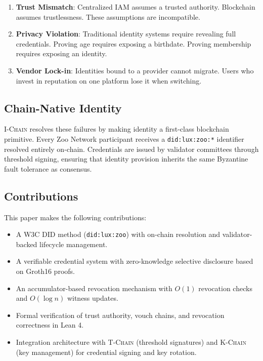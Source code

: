\documentclass[11pt,letterpaper]{article}
\theoremstyle{definition}
\theoremstyle{remark}
\newcommand{\IChain}{\textsc{I-Chain}}
\newcommand{\TChain}{\textsc{T-Chain}}
\newcommand{\KChain}{\textsc{K-Chain}}
\begin{document}
\begin{enumerate}
\item \textbf{Trust Mismatch}: Centralized IAM assumes a trusted authority. Blockchain assumes trustlessness. These assumptions are incompatible.
\item \textbf{Privacy Violation}: Traditional identity systems require revealing full credentials. Proving age requires exposing a birthdate. Proving membership requires exposing an identity.
\item \textbf{Vendor Lock-in}: Identities bound to a provider cannot migrate. Users who invest in reputation on one platform lose it when switching.
\end{enumerate}

\subsection{Chain-Native Identity}

\IChain{} resolves these failures by making identity a first-class blockchain primitive. Every Zoo Network participant receives a \texttt{did:lux:zoo:*} identifier resolved entirely on-chain. Credentials are issued by validator committees through threshold signing, ensuring that identity provision inherits the same Byzantine fault tolerance as consensus.

\subsection{Contributions}

This paper makes the following contributions:

\begin{itemize}
\item A W3C DID method (\texttt{did:lux:zoo}) with on-chain resolution and validator-backed lifecycle management.
\item A verifiable credential system with zero-knowledge selective disclosure based on Groth16 proofs.
\item An accumulator-based revocation mechanism with $O(1)$ revocation checks and $O(\log n)$ witness updates.
\item Formal verification of trust authority, vouch chains, and revocation correctness in Lean 4.
\item Integration architecture with \TChain{} (threshold signatures) and \KChain{} (key management) for credential signing and key rotation.
\end{itemize}
\end{document}
